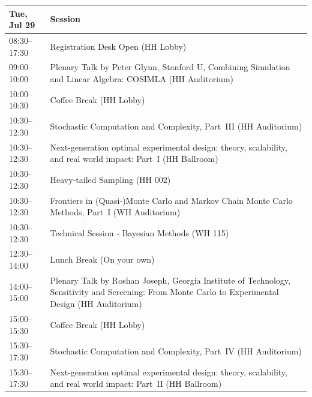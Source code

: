 \begin{table}
{\footnotesize
\begin{tabularx}{\textwidth}{>{\hsize=0.32\hsize}X|>{\hsize=1.7\hsize}X}
\hline
\textbf{Tue, Jul 29} & \textbf{Session} \\
\hline
\cellcolor{\EmptyColor}08:30--17:30 & \cellcolor{\EmptyColor}Registration Desk Open (HH Lobby) \\
\cellcolor{\PlenaryColor}09:00--10:00 & \cellcolor{\PlenaryColor}Plenary Talk by Peter Glynn, Stanford U, Combining Simulation and Linear Algebra: COSIMLA (HH Auditorium) \\
\cellcolor{\EmptyColor}10:00--10:30 & \cellcolor{\EmptyColor}Coffee Break (HH Lobby) \\
\cellcolor{\SessionTitleColor}10:30--12:30 & \cellcolor{\SessionTitleColor}Stochastic Computation and Complexity, Part~III (HH Auditorium) \\
\cellcolor{\SessionTitleColor}10:30--12:30 & \cellcolor{\SessionTitleColor}Next-generation optimal experimental design: theory, scalability, and real world impact: Part~I (HH Ballroom) \\
\cellcolor{\SessionTitleColor}10:30--12:30 & \cellcolor{\SessionTitleColor}Heavy-tailed Sampling (HH 002) \\
\cellcolor{\SessionTitleColor}10:30--12:30 & \cellcolor{\SessionTitleColor}Frontiers in (Quasi-)Monte Carlo and Markov Chain Monte Carlo Methods, Part~I (WH Auditorium) \\
\cellcolor{\SessionLightColor}10:30--12:30 & \cellcolor{\SessionLightColor}Technical Session - Bayesian Methods (WH 115) \\
\cellcolor{\EmptyColor}12:30--14:00 & \cellcolor{\EmptyColor}Lunch Break (On your own) \\
\cellcolor{\PlenaryColor}14:00--15:00 & \cellcolor{\PlenaryColor}Plenary Talk by Roshan Joseph, Georgia Institute of Technology, Sensitivity and Screening: From Monte Carlo to Experimental Design (HH Auditorium) \\
\cellcolor{\EmptyColor}15:00--15:30 & \cellcolor{\EmptyColor}Coffee Break (HH Lobby) \\
\cellcolor{\SessionTitleColor}15:30--17:30 & \cellcolor{\SessionTitleColor}Stochastic Computation and Complexity, Part~IV (HH Auditorium) \\
\cellcolor{\SessionTitleColor}15:30--17:30 & \cellcolor{\SessionTitleColor}Next-generation optimal experimental design: theory, scalability, and real world impact: Part~II (HH Ballroom) \\

\end{tabularx}}
\end{table}
